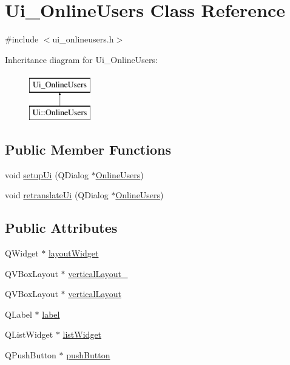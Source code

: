 \hypertarget{classUi__OnlineUsers}{\section{Ui\-\_\-\-Online\-Users Class Reference}
\label{classUi__OnlineUsers}
}


{\ttfamily \#include $<$ui\-\_\-onlineusers.\-h$>$}

Inheritance diagram for Ui\-\_\-\-Online\-Users\-:\begin{figure}[H]
\begin{center}
\leavevmode
\includegraphics[height=2.000000cm]{classUi__OnlineUsers}
\end{center}
\end{figure}
\subsection*{Public Member Functions}
\begin{DoxyCompactItemize}
\item 
void \hyperlink{classUi__OnlineUsers_a9263fec0300a50f4165101010a620d83}{setup\-Ui} (Q\-Dialog $\ast$\hyperlink{classOnlineUsers}{Online\-Users})
\item 
void \hyperlink{classUi__OnlineUsers_a6fa96f40d3e100a270a02307b344df11}{retranslate\-Ui} (Q\-Dialog $\ast$\hyperlink{classOnlineUsers}{Online\-Users})
\end{DoxyCompactItemize}
\subsection*{Public Attributes}
\begin{DoxyCompactItemize}
\item 
Q\-Widget $\ast$ \hyperlink{classUi__OnlineUsers_a1ae3a7c0c8ef39ecb1de05e649d01e93}{layout\-Widget}
\item 
Q\-V\-Box\-Layout $\ast$ \hyperlink{classUi__OnlineUsers_aca89e5d2a0b4e36c96cb7d303d1068fe}{vertical\-Layout\-\_}
\item 
Q\-V\-Box\-Layout $\ast$ \hyperlink{classUi__OnlineUsers_aec3870a3ac2e7aa907a2984775ce2370}{vertical\-Layout}
\item 
Q\-Label $\ast$ \hyperlink{classUi__OnlineUsers_a19669e58b217ccc41868c3ad9ee0415b}{label}
\item 
Q\-List\-Widget $\ast$ \hyperlink{classUi__OnlineUsers_a9a039e91b6f44b0b42dc465fd4c5db18}{list\-Widget}
\item 
Q\-Push\-Button $\ast$ \hyperlink{classUi__OnlineUsers_a87fd92269104f4155834b5ea8701dfa2}{push\-Button}
\end{DoxyCompactItemize}


